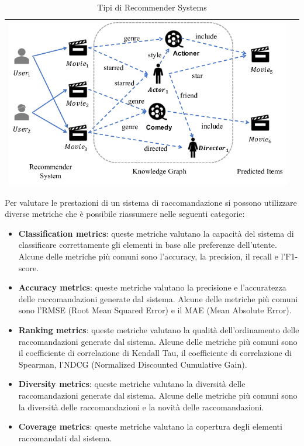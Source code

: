 \begin{table}[H]
\begin{tabularx}{\textwidth}{|X|X|}
        \includegraphics[width=\linewidth, trim=0 0 0 0]{images/knowledge.png} \\
        \hline
    \end{tabularx}
    \caption{Tipi di Recommender Systems}
\end{table}


\noindent Per valutare le prestazioni di un sistema di raccomandazione si possono utilizzare diverse metriche che è possibile riassumere nelle seguenti categorie:
\begin{itemize}    
    \item \textbf{Classification metrics}: queste metriche valutano la capacità del sistema di classificare correttamente gli elementi in base alle preferenze dell'utente. Alcune delle metriche più comuni sono l'accuracy, la precision, il recall e l'F1-score.

    \item \textbf{Accuracy metrics}: queste metriche valutano la precisione e l'accuratezza delle raccomandazioni generate dal sistema. Alcune delle metriche più comuni sono l'RMSE (Root Mean Squared Error) e il MAE (Mean Absolute Error).
    \item \textbf{Ranking metrics}: queste metriche valutano la qualità dell'ordinamento delle raccomandazioni generate dal sistema. Alcune delle metriche più comuni sono il coefficiente di correlazione di Kendall Tau, il coefficiente di correlazione di Spearman, l'NDCG (Normalized Discounted Cumulative Gain).
    \item \textbf{Diversity metrics}: queste metriche valutano la diversità delle raccomandazioni generate dal sistema. Alcune delle metriche più comuni sono la diversità delle raccomandazioni e la novità delle raccomandazioni.
    \item \textbf{Coverage metrics}: queste metriche valutano la copertura degli elementi raccomandati dal sistema.
\end{itemize}    

